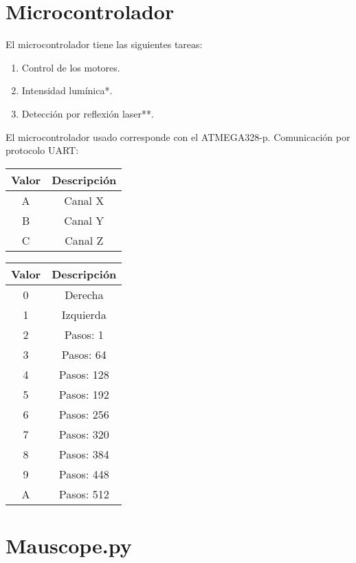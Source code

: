 \documentclass{wileysix}
\begin{document}
\subtitle{Microscop\'ia Moderna}

\halftitlepage
\titlepage



\tableofcontents
\chapter{Microcontrolador}
El microcontrolador tiene las siguientes tareas: 
\begin{enumerate}
	\item Control de los motores.
	\item Intensidad lumínica*.
	\item Detección por reflexión laser**.
\end{enumerate}

El microcontrolador usado corresponde con el ATMEGA328-p.
Comunicaci\'on por protocolo UART:
\begin{table}[h]
	\centering
	\begin{tabular}{cc}
		\hline
		\textbf{Valor} & \textbf{Descripción}\\
		\hline
		A & Canal X \\
		B & Canal Y \\
		C & Canal Z \\
		\hline
	\end{tabular}
\end{table}

\begin{table}[h]
	\centering
	\begin{tabular}{cc}
		\hline
		\textbf{Valor} & \textbf{Descripción}\\
		\hline
		0 & Derecha \\
		1 & Izquierda \\
		2 & Pasos: 1 \\
		3 & Pasos: 64 \\
		4 & Pasos: 128 \\
		5 & Pasos: 192 \\
		6 & Pasos: 256 \\
		7 & Pasos: 320 \\
		8 & Pasos: 384 \\
		9 & Pasos: 448 \\
		A & Pasos: 512 \\
		\hline
	\end{tabular}
\end{table}

\chapter{Mauscope.py}
\end{document}
